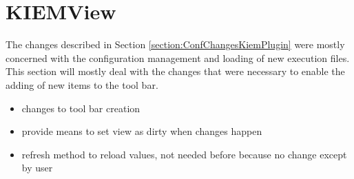\section{KIEMView}
\label{section:ConfChangesKiemView}
The changes described in Section \ref{section:ConfChangesKiemPlugin} were mostly concerned with the
configuration management and loading of new execution files. This section will mostly deal with the changes
that were necessary to enable the adding of new items to the tool bar.

\begin{itemize}
 \item changes to tool bar creation
 \item provide means to set view as dirty when changes happen
 \item refresh method to reload values, not needed before because no change except by user
\end{itemize}